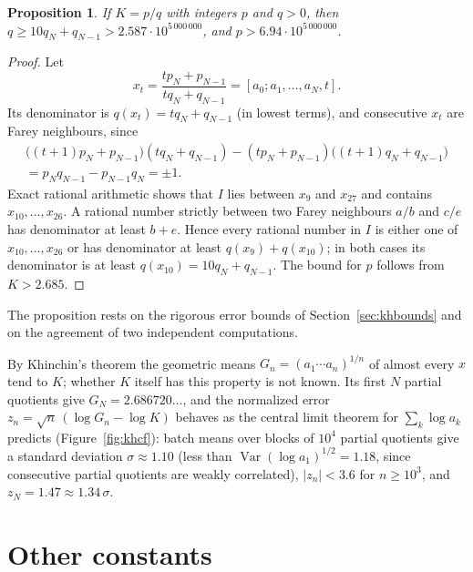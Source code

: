 \documentclass[11pt,reqno]{amsart}
\newtheorem{proposition}[theorem]{Proposition}
\theoremstyle{definition}
\theoremstyle{remark}
\begin{document}
\begin{proposition}\label{thm:khrat}
If $K = p/q$ with
integers $p$ and $q > 0$, then $q \ge 10q_N + q_{N-1} > 2.587\cdot10^{5\,000\,000}$, and $p > 6.94\cdot10^{5\,000\,000}$.
\end{proposition}

\begin{proof}
Let
\[
  x_t = \frac{tp_N + p_{N-1}}{tq_N + q_{N-1}} = [a_0; a_1, \ldots, a_N, t].
\]
Its denominator is $q(x_t) = tq_N + q_{N-1}$ (in lowest terms), and consecutive $x_t$ are Farey neighbours, since
\begin{multline*}
  \bigl((t+1)p_N + p_{N-1}\bigr)(tq_N + q_{N-1}) - (tp_N + p_{N-1})\bigl((t+1)q_N + q_{N-1}\bigr) \\
  = p_Nq_{N-1} - p_{N-1}q_N = \pm1.
\end{multline*}
Exact rational arithmetic shows that $I$ lies
between $x_9$ and $x_{27}$ and contains $x_{10}, \ldots, x_{26}$. A rational number strictly between two Farey
neighbours $a/b$ and $c/e$ has denominator at least $b + e$. Hence every rational number in $I$ is either one of
$x_{10}, \ldots, x_{26}$ or has denominator at least $q(x_9) + q(x_{10})$; in both cases its denominator is at least
$q(x_{10}) = 10q_N + q_{N-1}$. The bound for $p$ follows from $K > 2.685$.
\end{proof}

The proposition rests on the rigorous error bounds of Section~\ref{sec:khbounds} and on the agreement of two
independent computations.

By Khinchin's theorem the geometric means $G_n = (a_1\cdots a_n)^{1/n}$ of almost every $x$ tend to $K$; whether
$K$ itself has this property is not known. Its first $N$ partial quotients give $G_N = 2.686720\ldots$, and the
normalized error $z_n = \sqrt n\,(\log G_n - \log K)$ behaves as the central limit theorem for $\sum_k\log a_k$
\cite{IK02} predicts (Figure~\ref{fig:khcf}): batch means over blocks of $10^4$ partial quotients give a standard
deviation $\sigma \approx 1.10$ (less than $\operatorname{Var}(\log a_1)^{1/2} = 1.18$, since consecutive partial quotients
are weakly correlated), $|z_n| < 3.6$ for $n \ge 10^3$, and $z_N = 1.47 \approx 1.34\,\sigma$.

\section{Other constants}\label{sec:other}
\end{document}

